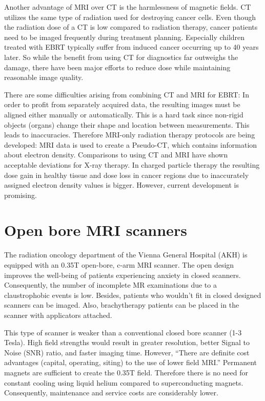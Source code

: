 \documentclass[parskip,bibtotoc,final,twoside=false,titlepage,a4paper,english,12pt,titlepage,a4paper]{scrbook}
\begin{document}
Another advantage of MRI over CT is the harmlessness of magnetic fields. CT utilizes the same type of radiation used for destroying cancer cells. Even though the radiation dose of a
CT is low compared to radiation therapy, cancer patients need to be imaged frequently during treatment planning. Especially children treated with EBRT typically
suffer from induced cancer occurring up to 40 years later. So while the benefit from using CT for diagnostics far outweighs the damage, there have been major efforts to
reduce dose while maintaining reasonable image quality. \cite{Murphy2007, Brenner2001, Sodickson2009, Smith2007, McCollough2009, Goldman2013}

There are some difficulties arising from combining CT and MRI for EBRT:
In order to profit from separately acquired data, the resulting images must be aligned either manually or automatically. This is a hard task since non-rigid objects (organs) change their shape and location between measurements. This leads to inaccuracies.
Therefore MRI-only radiation therapy protocols are being developed:
MRI data is used to create a Pseudo-CT, which contains information about electron density. Comparisons to using CT and MRI have shown acceptable deviations for X-ray therapy.
In charged particle therapy the resulting dose gain in healthy tissue and dose loss in cancer regions due to inaccurately assigned electron density values is bigger.
However, current development is promising. \cite{Rank2013, Stanescu2006, Nyholm2015, Greer2015, Chen2004}

\section{Open bore MRI scanners}

The radiation oncology department of the Vienna General Hospital (AKH) is equipped with an 0.35T open-bore, c-arm MRI scanner. The open design improves the well-being of patients
experiencing anxiety in closed scanners. Consequently, the number of incomplete MR examinations due to a claustrophobic events is low. \cite{Enders2011a, Bangard2007}
Besides, patients who wouldn't fit in closed designed scanners can be imaged.
Also, brachytherapy patients can be placed in the scanner with applicators attached.

This type of scanner is weaker than a conventional closed bore scanner (1-3 Tesla). High field strengths would result in greater resolution, better Signal to Noise (SNR) ratio, and faster imaging time.
However, ``There are definite cost advantages (capital, operating, siting) to the use of lower field MRI.'' \cite{Rutt1996}
Permanent magnets are sufficient to create the 0.35T field. Therefore there is no need for constant cooling using liquid helium compared to superconducting magnets.
Consequently, maintenance and service costs are considerably lower.
\end{document}
